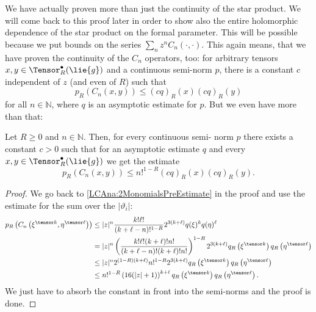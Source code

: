 \begin{remark}
	\mbox{}
	\label{Rem:LCAna:CnOperators}
	We have actually proven more than just the continuity of the star product. 
	We will come back to this proof later in order to show also the entire 
	holomorphic dependence of the star product on the formal parameter. This 
	will be possible because we put bounds on the series 
	$\sum_n z^n C_n(\cdot, \cdot)$.
	This again means, that we have proven the continuity of the $C_n$ 
	operators, too: for arbitrary tensors $x, y \in \Tensor_R^{\bullet}
	(\lie{g})$ and a continuous semi-norm $p$, there is a constant $c$ 
	independent of $z$ (and even of $R$) such that
	\begin{equation}
		\label{LCAna:CnOperators}
		p_R
		\left( C_n(x, y) \right)
		\leq
		(c q)_R (x)
		(c q)_R (y)
	\end{equation}
	for all $n \in \mathbb{N}$, where $q$ is an asymptotic estimate 
	for $p$. But we even have more than that:
\end{remark}
\begin{corollary}
	\label{Coro:LCAna:ContinuityCn}
	Let $R \geq 0$ and $n \in \mathbb{N}$. Then, for every continuous semi-
	norm $p$ there exists a constant $c > 0$ such that for an asymptotic 
	estimate $q$ and every $x,y \in \Tensor_R^{\bullet}(\lie{g})$ we get
	the estimate
	\begin{equation}
		\label{LCAna:ContinuityCn}
		p_R \left( C_n(x,y) \right)
		\leq
		n!^{1 - R}
		(c q)_R(x) (c q)_R(y).
	\end{equation}
\end{corollary}
\begin{proof}
	We go back to \eqref{LCAna:2MonomialsPreEstimate} in the proof and use the 
	estimate for the sum over the $|\vartheta_i|$:
	\begin{align*}
		p_R \left(
			C_n \left( \xi^{\tensor k}, \eta^{\tensor \ell} \right)
		\right)
		& \leq
		|z|^n
		\frac{k! \ell!}{(k + \ell - n)!^{1-R}}
		2^{3(k + \ell)}
		q(\xi)^k q(\eta)^{\ell}
		\\
		& =
		|z|^n
		\left(
			\frac{k! \ell! (k + \ell)! n!}
			{(k + \ell - n)! (k + \ell)! n!}
		\right)^{1 - R}
		2^{3(k + \ell)}
		q_R\left( \xi^{\tensor k} \right)
		q_R\left( \eta^{\tensor \ell} \right)
		\\
		& \leq
		|z|^n
		2^{(1 - R)(k + \ell)}
		n!^{1 - R}
		2^{3(k + \ell)}
		q_R\left( \xi^{\tensor k} \right)
		q_R\left( \eta^{\tensor \ell} \right)
		\\
		& \leq
		n!^{1-R}
		\left( 16 (|z| + 1) \right)^{k + \ell}
		q_R\left( \xi^{\tensor k} \right)
		q_R\left( \eta^{\tensor \ell} \right).
	\end{align*}
	We just have to absorb the constant in front into the semi-norms and the 
	proof is done.
\end{proof}
